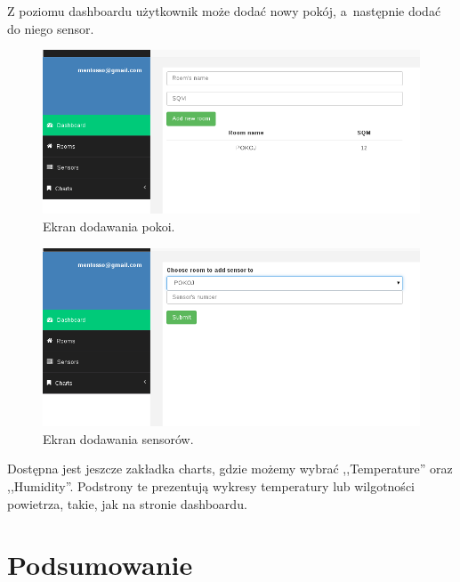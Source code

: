 \documentclass[eng,oneside]{mgr}
\begin{document}
Z poziomu dashboardu użytkownik może dodać nowy pokój, a~następnie dodać do niego sensor.
\begin{figure}[h]
\centering
\includegraphics[width=\linewidth]{./rooms1}
\caption{Ekran dodawania pokoi.}
\label{fig:ekran_rejestracji}
\end{figure}
\clearpage
\begin{figure}[h]
\centering
\includegraphics[width=\linewidth]{./sensors}
\caption{Ekran dodawania sensorów.}
\label{fig:ekran_rejestracji}
\end{figure}

Dostępna jest jeszcze zakładka charts, gdzie możemy wybrać ,,Temperature'' oraz ,,Humidity''. Podstrony te prezentują wykresy temperatury lub wilgotności powietrza, takie, jak na stronie dashboardu.

\chapter{Podsumowanie}
\end{document}
